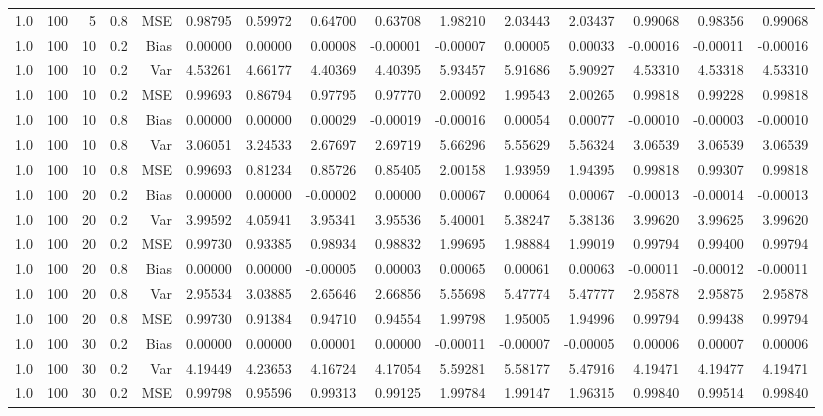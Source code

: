 \begin{table}[!htbp]
\begin{tabular}{lrrrrrrrrrrrrrr}
1.0 & 100 &  5 & 0.8 & MSE & 0.98795 & 0.59972 & 0.64700 & 0.63708 & 1.98210 & 2.03443 & 2.03437 & 0.99068 & 0.98356 & 0.99068 \\
1.0 & 100 & 10 & 0.2 & Bias & 0.00000 & 0.00000 & 0.00008 & -0.00001 & -0.00007 & 0.00005 & 0.00033 & -0.00016 & -0.00011 & -0.00016 \\
1.0 & 100 & 10 & 0.2 & Var & 4.53261 & 4.66177 & 4.40369 & 4.40395 & 5.93457 & 5.91686 & 5.90927 & 4.53310 & 4.53318 & 4.53310 \\
1.0 & 100 & 10 & 0.2 & MSE & 0.99693 & 0.86794 & 0.97795 & 0.97770 & 2.00092 & 1.99543 & 2.00265 & 0.99818 & 0.99228 & 0.99818 \\
1.0 & 100 & 10 & 0.8 & Bias & 0.00000 & 0.00000 & 0.00029 & -0.00019 & -0.00016 & 0.00054 & 0.00077 & -0.00010 & -0.00003 & -0.00010 \\
1.0 & 100 & 10 & 0.8 & Var & 3.06051 & 3.24533 & 2.67697 & 2.69719 & 5.66296 & 5.55629 & 5.56324 & 3.06539 & 3.06539 & 3.06539 \\
1.0 & 100 & 10 & 0.8 & MSE & 0.99693 & 0.81234 & 0.85726 & 0.85405 & 2.00158 & 1.93959 & 1.94395 & 0.99818 & 0.99307 & 0.99818 \\
1.0 & 100 & 20 & 0.2 & Bias & 0.00000 & 0.00000 & -0.00002 & 0.00000 & 0.00067 & 0.00064 & 0.00067 & -0.00013 & -0.00014 & -0.00013 \\
1.0 & 100 & 20 & 0.2 & Var & 3.99592 & 4.05941 & 3.95341 & 3.95536 & 5.40001 & 5.38247 & 5.38136 & 3.99620 & 3.99625 & 3.99620 \\
1.0 & 100 & 20 & 0.2 & MSE & 0.99730 & 0.93385 & 0.98934 & 0.98832 & 1.99695 & 1.98884 & 1.99019 & 0.99794 & 0.99400 & 0.99794 \\
1.0 & 100 & 20 & 0.8 & Bias & 0.00000 & 0.00000 & -0.00005 & 0.00003 & 0.00065 & 0.00061 & 0.00063 & -0.00011 & -0.00012 & -0.00011 \\
1.0 & 100 & 20 & 0.8 & Var & 2.95534 & 3.03885 & 2.65646 & 2.66856 & 5.55698 & 5.47774 & 5.47777 & 2.95878 & 2.95875 & 2.95878 \\
1.0 & 100 & 20 & 0.8 & MSE & 0.99730 & 0.91384 & 0.94710 & 0.94554 & 1.99798 & 1.95005 & 1.94996 & 0.99794 & 0.99438 & 0.99794 \\
1.0 & 100 & 30 & 0.2 & Bias & 0.00000 & 0.00000 & 0.00001 & 0.00000 & -0.00011 & -0.00007 & -0.00005 & 0.00006 & 0.00007 & 0.00006 \\
1.0 & 100 & 30 & 0.2 & Var & 4.19449 & 4.23653 & 4.16724 & 4.17054 & 5.59281 & 5.58177 & 5.47916 & 4.19471 & 4.19477 & 4.19471 \\
1.0 & 100 & 30 & 0.2 & MSE & 0.99798 & 0.95596 & 0.99313 & 0.99125 & 1.99784 & 1.99147 & 1.96315 & 0.99840 & 0.99514 & 0.99840 \\

\end{tabular}
\end{table}
